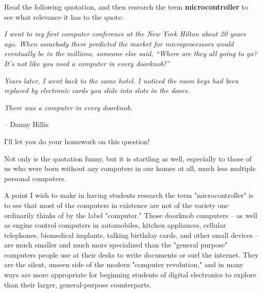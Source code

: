 

Read the following quotation, and then research the term {\bf microcontroller} to see what relevance it has to the quote:

\vskip 10pt {\narrower \noindent \baselineskip5pt

\noindent
{\it I went to my first computer conference at the New York Hilton about 20 years ago.  When somebody there predicted the market for microprocessors would eventually be in the millions, someone else said, ``Where are they all going to go? It's not like you need a computer in every doorknob!''}

\vskip 10pt

\noindent
{\it Years later, I went back to the same hotel.  I noticed the room keys had been replaced by electronic cards you slide into slots in the doors.}

\vskip 10pt

\noindent
{\it There was a computer in every doorknob.}

\vskip 10pt

\noindent
-- Danny Hillis

\par} \vskip 10pt







I'll let you do your homework on this question!







Not only is the quotation funny, but it is startling as well, especially to those of us who were born without any computers in our homes at all, much less multiple personal computers.

A point I wish to make in having students research the term "microcontroller" is to see that most of the computers in existence are not of the variety one ordinarily thinks of by the label "computer."  Those doorknob computers -- as well as engine control computers in automobiles, kitchen appliances, cellular telephones, biomedical implants, talking birthday cards, and other small devices -- are much smaller and much more specialized than the "general purpose" computers people use at their desks to write documents or surf the internet.  They are the silent, unseen side of the modern "computer revolution," and in many ways are more appropriate for beginning students of digital electronics to explore than their larger, general-purpose counterparts.





